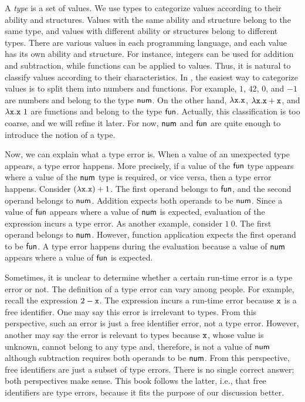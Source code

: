 A \textit{type}
is a set of values. We use types to categorize values according to their
ability and structures. Values with the same ability and structure belong to the
same type, and values with different ability or structures belong to different
types. There are various values in each programming language, and each value has its
own ability and structure. For instance, integers can be used for addition and
subtraction, while functions can be applied to values. Thus, it is natural to
classify values according to their characteristics. In \Lang, the easiest way to
categorize values is to split them into numbers and functions. For example, $1$,
$42$, $0$, and $-1$ are numbers and belong to the type $\textsf{num}$.
On the other hand, $\lambda \texttt{x}.\texttt{x}$, $\lambda \texttt{x}.\texttt{x}+\texttt{x}$, and $\lambda \texttt{x}.\texttt{x}\ 1$
are functions and belong to the type $\textsf{fun}$. Actually, this classification is
too coarse, and we will refine it later. For now, $\textsf{num}$ and $\textsf{fun}$ are quite
enough to introduce the notion of a type.

Now, we can explain what a type error is. When a value of an unexpected type
appears, a type error happens. More precisely, if a value of the $\textsf{fun}$ type
appears where a value of the $\textsf{num}$ type is required, or vice versa, then a
type error happens. Consider $(\lambda \texttt{x}.\texttt{x})+1$. The first operand belongs
to $\textsf{fun}$, and the second operand belongs to $\textsf{num}$. Addition expects both
operands to be $\textsf{num}$. Since a value of $\textsf{fun}$ appears where a value of
$\textsf{num}$ is expected, evaluation of the expression incurs a type error.
As another example, consider $1\ 0$. The first operand belongs to $\textsf{num}$.
However, function application expects the first operand to be $\textsf{fun}$. A type
error happens during the evaluation because a value of $\textsf{num}$ appears where a
value of $\textsf{fun}$ is expected.

Sometimes, it is unclear to determine whether a certain run-time error is a type error
or not. The definition of a type error can vary among people. For example,
recall the expression $2-\texttt{x}$. The expression incurs a run-time error because
$\texttt{x}$ is a free identifier. One may say this error is irrelevant to types. From
this perspective, such an error is just a free identifier error, not a type
error. However, another may say the error is relevant to types because
$\texttt{x}$, whose value is unknown, cannot belong to any type and, therefore, is not a
value of $\textsf{num}$ although subtraction requires both operands to be $\textsf{num}$.
From this perspective, free identifiers are just a subset of type errors. There is
no single correct answer; both perspectives make sense. This book follows the
latter, i.e., that free identifiers are type errors, because it fits the purpose
of our discussion better.

